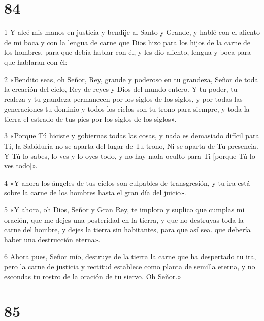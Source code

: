 \chapter{84}

\par 1 Y alcé mis manos en justicia y bendije al Santo y Grande, y hablé con el aliento de mi boca y con la lengua de carne que Dios hizo para los hijos de la carne de los hombres, para que debía hablar con él, y les dio aliento, lengua y boca para que hablaran con él:
\par 2 «Bendito seas, oh Señor, Rey, grande y poderoso en tu grandeza, Señor de toda la creación del cielo, Rey de reyes y Dios del mundo entero. Y tu poder, tu realeza y tu grandeza permanecen por los siglos de los siglos, y por todas las generaciones tu dominio y todos los cielos son tu trono para siempre, y toda la tierra el estrado de tus pies por los siglos de los siglos».
\par 3 «Porque Tú hiciste y gobiernas todas las cosas, y nada es demasiado difícil para Ti, la Sabiduría no se aparta del lugar de Tu trono, Ni se aparta de Tu presencia. Y Tú lo sabes, lo ves y lo oyes todo, y no hay nada oculto para Ti [porque Tú lo ves todo]».
\par 4 «Y ahora los ángeles de tus cielos son culpables de transgresión, y tu ira está sobre la carne de los hombres hasta el gran día del juicio».
\par 5 «Y ahora, oh Dios, Señor y Gran Rey, te imploro y suplico que cumplas mi oración, que me dejes una posteridad en la tierra, y que no destruyas toda la carne del hombre, y dejes la tierra sin habitantes, para que así sea. que debería haber una destrucción eterna».
\par 6 Ahora pues, Señor mío, destruye de la tierra la carne que ha despertado tu ira, pero la carne de justicia y rectitud establece como planta de semilla eterna, y no escondas tu rostro de la oración de tu siervo. Oh Señor.»

\chapter{85}

